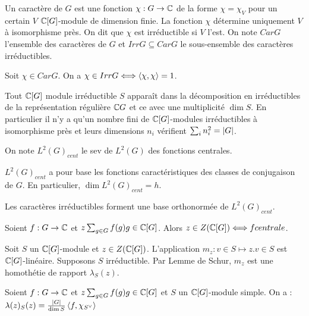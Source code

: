 \documentclass{cours}
\begin{document}
\begin{definition}
    Un caractère de $G$ est une fonction $\chi : G \rightarrow \mathbb{C}$ de la forme $\chi = \chi_V$ pour un certain $V$ $\mathbb{C}[G]$-module de dimension finie. La fonction $\chi$ détermine uniquement $V$ à isomorphisme près. On dit que $\chi$ est irréductible si $V$ l'est. On note $Car G$ l'ensemble des caractères de $G$ et $Irr G \subseteq Car G$ le sous-ensemble des caractères irréductibles. 
\end{definition}

\begin{corollary}
    Soit $\chi \in Car G$. On a $\chi \in Irr G \Longleftrightarrow \left\langle \chi, \chi \right\rangle = 1$.
\end{corollary}

\begin{corollary}
    Tout $\mathbb{C}[G]$ module irréductible $S$ apparaît dans la décomposition en irréductibles de la représentation régulière $\mathbb{C} G$ et ce avec une multiplicité $\dim S$. En particulier il n'y a qu'un nombre fini de $\mathbb{C}[G]$-modules irréductibles à isomorphisme près et leurs dimensions $n_{i}$ vérifient $\sum_{i}n_{i}^{2} = \left|G\right|$.
\end{corollary}

\begin{definition}
    On note $L^{2}(G)_{cent}$ le sev de $L^{2}(G)$ des fonctions centrales. 
\end{definition}

\begin{lemma}
    $L^{2}(G)_{cent}$ a pour base les fonctions caractéristiques des classes de conjugaison de $G$. En particulier, $\dim L^{2}(G)_{cent} = h$. 
\end{lemma}

\begin{theorem}
    Les caractères irréductibles forment une base orthonormée de $L^{2}(G)_{cent}$.
\end{theorem}

\begin{lemma}
    Soient $f : G \rightarrow \mathbb{C}$ et $z \sum_{g \in G}f(g)g \in \mathbb{C}[G]$. Alors $z \in Z(\mathbb{C}[G]) \Longleftrightarrow f centrale$.
\end{lemma}

\begin{definition}
    Soit $S$ un $\mathbb{C}[G]$-module et $z \in Z(\mathbb{C}[G])$. L'application $m_{z} : v \in S \mapsto z.v \in S$ est $\mathbb{C}[G]$-linéaire. Supposons $S$ irréductible. Par Lemme de Schur, $m_{z}$ est une homothétie de rapport $\lambda_{S}(z)$.
\end{definition}

\begin{lemma}
    Soient $f : G \rightarrow \mathbb{C}$ et $z \sum_{g \in G}f(g)g \in \mathbb{C}[G]$ et $S$ un $\mathbb{C}[G]$-module simple. On a : $\lambda(z)_{S}(z) = \frac{\left|G\right|}{\dim S}\left\langle f, \chi_{S^{\lor}} \right\rangle$
\end{lemma}
\end{document}
